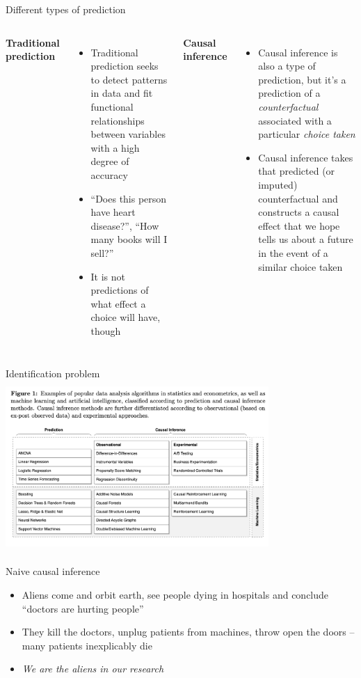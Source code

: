 \documentclass{beamer}
\begin{document}
\begin{frame}{Different types of prediction}

  \begin{columns}
    \centering
    \textbf{Traditional prediction}
    \begin{itemize}
      \item Traditional prediction seeks to detect patterns in data and fit functional relationships between variables with a high degree of accuracy
      \item ``Does this person have heart disease?'', ``How many books will I sell?''
      \item It is not predictions of what effect a choice will have, though
    \end{itemize}
    \centering
    \textbf{Causal inference}
    \begin{itemize}
      \item Causal inference is also a type of prediction, but it's a prediction of a \emph{counterfactual} associated with a particular \emph{choice taken}
      \item Causal inference takes that predicted (or imputed) counterfactual and constructs a causal effect that we hope tells us about a future in the event of a similar choice taken
    \end{itemize}
  \end{columns}
\end{frame}


\begin{frame}{Identification problem}
  \centering
  \includegraphics[scale=0.5,height=6.5cm, width=10cm]{./lecture_includes/prediction_causality.png}
\end{frame}




\begin{frame}{Naive causal inference}

  \begin{itemize}
    \item Aliens come and orbit earth, see people dying in hospitals and conclude ``doctors are hurting people''
    \item They kill the doctors, unplug patients from machines, throw open the doors -- many patients inexplicably die
    \item \emph{We are the aliens in our research}
  \end{itemize}

\end{frame}
\end{document}
